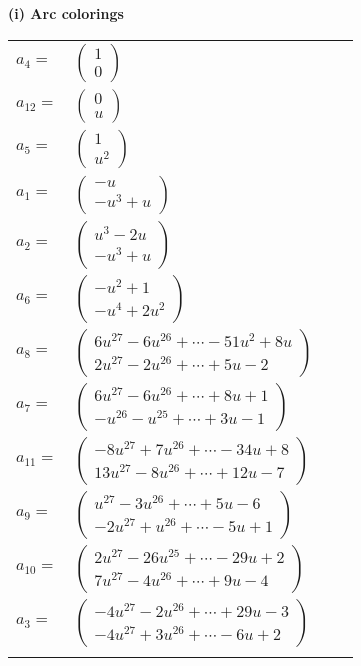 \documentclass[1p]{elsarticle_modified}
\theoremstyle{definition}
\begin{document}
\flushleft \textbf{(i) Arc colorings}\\
\begin{tabular}{m{7pt} m{180pt} m{7pt} m{180pt} }
\flushright $a_{4}=$&$\begin{pmatrix}1\\0\end{pmatrix}$ \\
\flushright $a_{12}=$&$\begin{pmatrix}0\\u\end{pmatrix}$ \\
\flushright $a_{5}=$&$\begin{pmatrix}1\\u^2\end{pmatrix}$ \\
\flushright $a_{1}=$&$\begin{pmatrix}- u\\- u^3+u\end{pmatrix}$ \\
\flushright $a_{2}=$&$\begin{pmatrix}u^3-2 u\\- u^3+u\end{pmatrix}$ \\
\flushright $a_{6}=$&$\begin{pmatrix}- u^2+1\\- u^4+2 u^2\end{pmatrix}$ \\
\flushright $a_{8}=$&$\begin{pmatrix}6 u^{27}-6 u^{26}+\cdots-51 u^2+8 u\\2 u^{27}-2 u^{26}+\cdots+5 u-2\end{pmatrix}$ \\
\flushright $a_{7}=$&$\begin{pmatrix}6 u^{27}-6 u^{26}+\cdots+8 u+1\\- u^{26}- u^{25}+\cdots+3 u-1\end{pmatrix}$ \\
\flushright $a_{11}=$&$\begin{pmatrix}-8 u^{27}+7 u^{26}+\cdots-34 u+8\\13 u^{27}-8 u^{26}+\cdots+12 u-7\end{pmatrix}$ \\
\flushright $a_{9}=$&$\begin{pmatrix}u^{27}-3 u^{26}+\cdots+5 u-6\\-2 u^{27}+u^{26}+\cdots-5 u+1\end{pmatrix}$ \\
\flushright $a_{10}=$&$\begin{pmatrix}2 u^{27}-26 u^{25}+\cdots-29 u+2\\7 u^{27}-4 u^{26}+\cdots+9 u-4\end{pmatrix}$ \\
\flushright $a_{3}=$&$\begin{pmatrix}-4 u^{27}-2 u^{26}+\cdots+29 u-3\\-4 u^{27}+3 u^{26}+\cdots-6 u+2\end{pmatrix}$\\&\end{tabular}
\end{document}
